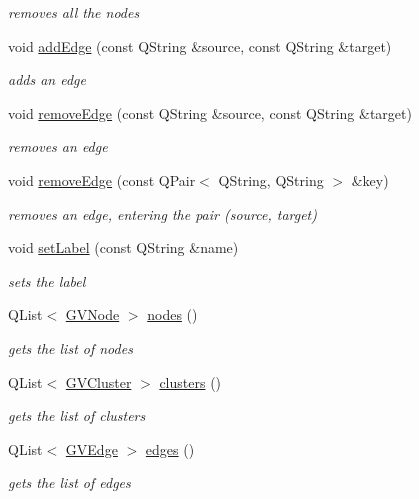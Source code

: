 \begin{DoxyCompactItemize}
\begin{DoxyCompactList}\small\item\em removes all the nodes \end{DoxyCompactList}\item 
void \hyperlink{class_g_v_sub_graph_a84df91480a9e3c7ec38658b475e13d90}{add\-Edge} (const \-Q\-String \&source, const \-Q\-String \&target)
\begin{DoxyCompactList}\small\item\em adds an edge \end{DoxyCompactList}\item 
void \hyperlink{class_g_v_sub_graph_adeec195e6301f14864ad3cf4ecb2a7e6}{remove\-Edge} (const \-Q\-String \&source, const \-Q\-String \&target)
\begin{DoxyCompactList}\small\item\em removes an edge \end{DoxyCompactList}\item 
void \hyperlink{class_g_v_sub_graph_a42c2d7c92a223e40364c13fdb1cc46e8}{remove\-Edge} (const \-Q\-Pair$<$ \-Q\-String, \-Q\-String $>$ \&key)
\begin{DoxyCompactList}\small\item\em removes an edge, entering the pair (source, target) \end{DoxyCompactList}\item 
void \hyperlink{class_g_v_sub_graph_a14a5e0a85c54220e4908e2692576e62b}{set\-Label} (const \-Q\-String \&name)
\begin{DoxyCompactList}\small\item\em sets the label \end{DoxyCompactList}\item 
\-Q\-List$<$ \hyperlink{struct_g_v_node}{\-G\-V\-Node} $>$ \hyperlink{class_g_v_sub_graph_a777c2146e514db2ccded4b3f77993155}{nodes} ()
\begin{DoxyCompactList}\small\item\em gets the list of nodes \end{DoxyCompactList}\item 
\-Q\-List$<$ \hyperlink{struct_g_v_cluster}{\-G\-V\-Cluster} $>$ \hyperlink{class_g_v_sub_graph_a52594db2f31cfb221820cbd48b6d3530}{clusters} ()
\begin{DoxyCompactList}\small\item\em gets the list of clusters \end{DoxyCompactList}\item 
\-Q\-List$<$ \hyperlink{struct_g_v_edge}{\-G\-V\-Edge} $>$ \hyperlink{class_g_v_sub_graph_a88469fa80e33d2506cde3b6352c3c508}{edges} ()
\begin{DoxyCompactList}\small\item\em gets the list of edges \end{DoxyCompactList}\end{DoxyCompactItemize}
